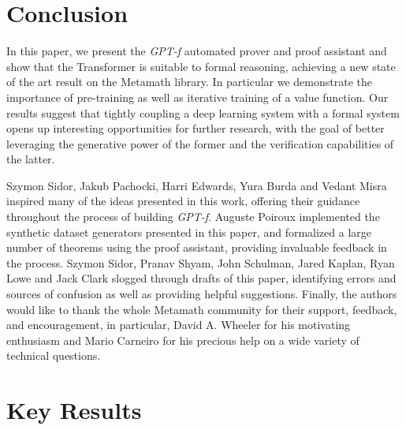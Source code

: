 \documentclass{article}
\begin{document}
\section{Conclusion}

In this paper, we present the \textit{GPT-f} automated prover and proof assistant and show that the Transformer is suitable to formal reasoning, achieving a new state of the art result on the Metamath library. In particular we demonstrate the importance of pre-training as well as iterative training of a value function. Our results suggest that tightly coupling a deep learning system with a formal system opens up interesting opportunities for further research, with the goal of better leveraging the generative power of the former and the verification capabilities of the latter.

\begin{ack}
Szymon Sidor, Jakub Pachocki, Harri Edwards, Yura Burda and Vedant Misra inspired many of the ideas presented in this work, offering their guidance throughout the process of building \textit{GPT-f}. Auguste Poiroux implemented the synthetic dataset generators presented in this paper, and formalized a large number of theorems using the proof assistant, providing invaluable feedback in the process. Szymon Sidor, Pranav Shyam, John Schulman, Jared Kaplan, Ryan Lowe and Jack Clark slogged through drafts of this paper, identifying errors and sources of confusion as well as providing helpful suggestions. Finally, the authors would like to thank the whole Metamath community for their support, feedback, and encouragement, in particular, David A. Wheeler for his motivating enthusiasm and Mario Carneiro for his precious help on a wide variety of technical questions.
\end{ack}




\appendix
\section{Key Results}
\end{document}
